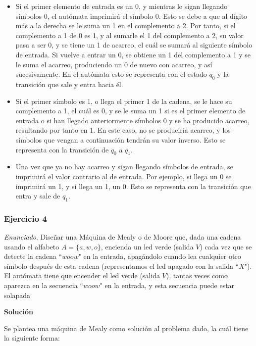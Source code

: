 \documentclass[11pt,a4paper]{article}
\newcommand{\enu}{\textit{Enunciado}}
\newcommand{\sol}{\textbf{Solución}}
\begin{document}
		\begin{itemize}
			\item Si el primer elemento de entrada es un 0, y mientras le sigan llegando símbolos 0, el autómata imprimirá
			el símbolo 0. Esto se debe a que al dígito más a la derecha se le suma un 1 en el complemento a 2. Por tanto,
			si el complemento a 1 de 0 es 1, y al sumarle el 1 del complemento a 2, su valor pasa a ser 0, y se tiene un 1 de
			acarreo, el cuál se sumará al siguiente símbolo de entrada. Si vuelve a entrar un 0, se obtiene un 1 del
			complemento a 1 y se le suma el acarreo, produciendo un 0 de nuevo con acarreo, y así sucesivamente. En el
			autómata esto se representa con el estado $q_0$ y la transición que sale y entra hacia él.
			\item Si el primer símbolo es 1, o llega el primer 1 de la cadena, se le hace su complemento a 1, el cuál es 0,
			y se le suma un 1 si es el primer elemento de entrada o si han llegado anteriormente símbolos 0 y se ha producido
			acarreo, resultando por tanto en 1. En este caso, no se produciría acarreo, y los símbolos que vengan a
			continuación tendrán su valor inverso. Esto se representa con la transición de $q_0$ a $q_1$.
			\item Una vez que ya no hay acarreo y sigan llegando símbolos de entrada, se imprimirá el valor contrario al de
			entrada. Por ejemplo, si llega un 0 se imprimirá un 1, y si llega un 1, un 0. Esto se representa con la transición
			que entra y sale de $q_1$.
		\end{itemize}						
		
		\subsubsection{Ejercicio 4}
		\enu. Diseñar una Máquina de Mealy o de Moore que, dada una cadena usando el alfabeto $A = \lbrace a, w, o
		\rbrace$, encienda un led verde (salida $V$) cada vez que se detecte la cadena ``$woow$" en la entrada,
		apagándolo cuando lea cualquier otro símbolo después de esta cadena (representamos el led apagado con la
		salida ``$X$"). El autómata tiene que encender el led verde (salida $V$), tantas veces como aparezca en la
		secuencia ``$woow$" en la entrada, y esta secuencia puede estar solapada \par
	
		\sol \par
		
		Se plantea una máquina de Mealy como solución al problema dado, la cuál tiene la siguiente forma:
		
\end{document}
